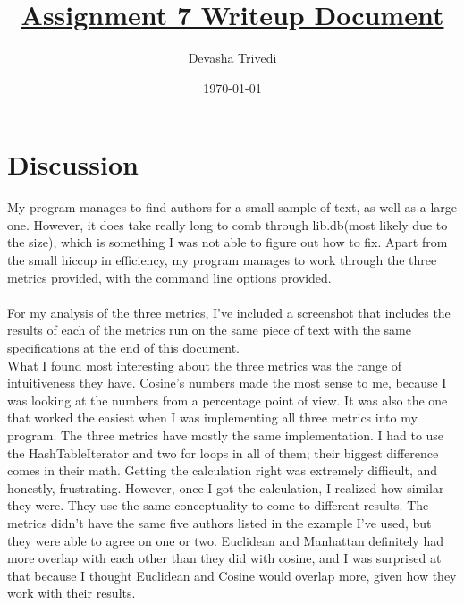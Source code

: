 \documentclass[12pt]{article}
\title{\textbf{\underline{Assignment 7 Writeup Document}}}
\author{Devasha Trivedi}
\date{\today}
\begin{document}
\maketitle

\section{Discussion}\label{ss:discussion}
My program manages to find authors for a small sample of text, as well as a large one.
However, it does take really long to comb through lib.db(most likely due to the size),
which is something I was not able to figure out how to fix. Apart from the small hiccup in efficiency,
my program manages to work through the three metrics provided, with the command line options provided.
\\\\For my analysis of the three metrics, I've included a screenshot that includes the results of each of
the metrics run on the same piece of text with the same specifications at the end of this document.
\\What I found most interesting about the three metrics was the range of intuitiveness they have.
Cosine's numbers made the most sense to me, because I was looking at the numbers from a percentage point of view.
It was also the one that worked the easiest when I was implementing all three metrics into my program.
The three metrics have mostly the same implementation. I had to use the HashTableIterator and two for loops in all of them;
their biggest difference comes in their math. Getting the calculation right was extremely difficult, and honestly, frustrating.
However, once I got the calculation, I realized how similar they were. They use the same conceptuality to come to different results.
The metrics didn't have the same five authors listed in the example I've used, but they were able to agree on one or two.
Euclidean and Manhattan definitely had more overlap with each other than they did with cosine, and I was surprised at that because I thought Euclidean and Cosine would overlap more, given how they work with their results.
\end{document}
